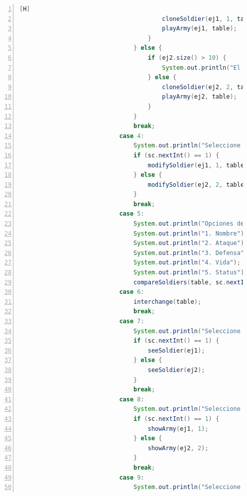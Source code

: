 \documentclass{article}
\begin{document}
\begin{lstlisting}[language=java,caption={Método main Final}, numbers=left][H]
                                        cloneSoldier(ej1, 1, table);
                                        playArmy(ej1, table);
                                    }
                                } else {
                                    if (ej2.size() > 10) {
                                        System.out.println("El ejercito no puede tener mas de 10 soldados");
                                    } else {
                                        cloneSoldier(ej2, 2, table);
                                        playArmy(ej2, table);
                                    }
                                }
                                break;
                            case 4:
                                System.out.println("Seleccione ejercito: ");
                                if (sc.nextInt() == 1) {
                                    modifySoldier(ej1, 1, table);
                                } else {
                                    modifySoldier(ej2, 2, table);
                                }
                                break;
                            case 5:
                                System.out.println("Opciones de comparacion: ");
                                System.out.println("1. Nombre");
                                System.out.println("2. Ataque");
                                System.out.println("3. Defensa");
                                System.out.println("4. Vida");
                                System.out.println("5. Status");
                                compareSoldiers(table, sc.nextInt());
                            case 6:
                                interchange(table);
                                break;
                            case 7:
                                System.out.println("Seleccione ejercito: ");
                                if (sc.nextInt() == 1) {
                                    seeSoldier(ej1);
                                } else {
                                    seeSoldier(ej2);
                                }
                                break;
                            case 8:
                                System.out.println("Seleccione ejercito: ");
                                if (sc.nextInt() == 1) {
                                    showArmy(ej1, 1);
                                } else {
                                    showArmy(ej2, 2);
                                }
                                break;
                            case 9:
                                System.out.println("Seleccione ejercito: ");

\end{lstlisting}
\end{document}

